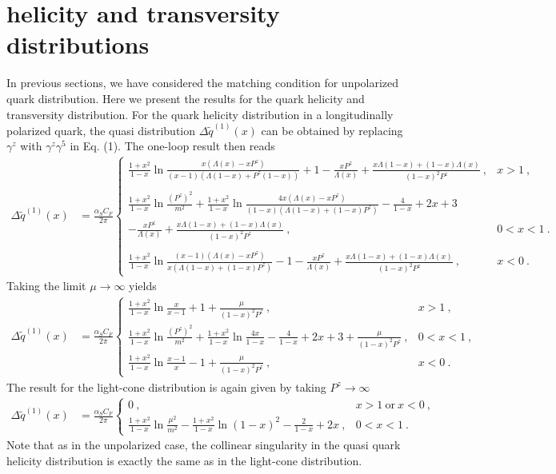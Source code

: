 \section{helicity and transversity distributions}
In previous sections, we have considered the matching condition for unpolarized quark distribution. Here we present the results for the quark helicity and transversity distribution. For the quark helicity distribution in a longitudinally polarized quark, the quasi distribution $\Delta \tilde q^{(1)}(x)$ can be obtained by replacing $\gamma^z$ with $\gamma^z\gamma^5$ in Eq. (1). The one-loop result then reads
\begin{align}\label{helivertexnoexp}
\Delta \tilde q^{(1)}(x)&=\frac{\alpha_S C_F}{2\pi} \left\{ \begin{array} {ll} \frac{1+x^2}{1-x}\ln \frac{x(\Lambda(x)-x P^z)}{(x-1)(\Lambda(1-x)+P^z(1-x))}+1-\frac{x P^z}{\Lambda(x)}+\frac{x\Lambda(1-x)+(1-x)\Lambda(x)}{(1-x)^2 P^z}\ , & x>1\ , \\
\ \\
\frac{1+x^2}{1-x}\ln\frac{(P^z)^2}{m^2}+\frac{1+x^2}{1-x}\ln \frac{4x(\Lambda(x)-x P^z)}{(1-x)(\Lambda(1-x)+(1-x)P^z)}-\frac{4}{1-x}+2x+3\ & \\
-\frac{x P^z}{\Lambda(x)}+\frac{x\Lambda(1-x)+(1-x)\Lambda(x)}{(1-x)^2 P^z}\ , & 0<x<1\ . \\
\ \\
\frac{1+x^2}{1-x}\ln \frac{(x-1)(\Lambda(x)-x P^z)}{x(\Lambda(1-x)+(1-x)P^z)}-1-\frac{x P^z}{\Lambda(x)}+\frac{x\Lambda(1-x)+(1-x)\Lambda(x)}{(1-x)^2P^z}\ , & x<0\ . \end{array} \right.
\end{align}
Taking the limit $\mu\rightarrow \infty$ yields
\begin{align}\label{helivertexLgmu}
\Delta \tilde q^{(1)}(x)&=\frac{\alpha_S C_F}{2\pi} \left\{ \begin{array} {ll} \frac{1+x^2}{1-x}\ln \frac{x}{x-1}+1+\frac{\mu}{(1-x)^2P^z}\ , & x>1\ , \\ \frac{1+x^2}{1-x}\ln \frac{(P^z)^2}{m^2}+\frac{1+x^2}{1-x}\ln\frac{4x}{1-x}-\frac{4}{1-x}+2x+3+\frac{\mu}{(1-x)^2P^z}\ , & 0<x<1\ , \\ \frac{1+x^2}{1-x}\ln \frac{x-1}{x}-1+\frac{\mu}{(1-x)^2P^z}\ , & x<0\ . \end{array} \right.
\end{align}
The result for the light-cone distribution is again given by taking $P^z\to\infty$
\begin{align}\label{helivertexIMF}
\Delta \tilde q^{(1)}(x)&=\frac{\alpha_S C_F}{2\pi} \left\{ \begin{array} {ll} 0\ , & x>1\  \mbox{or}\  x<0\ , \\ \frac{1+x^2}{1-x}\ln \frac{\mu^2}{m^2}-\frac{1+x^2}{1-x}\ln{(1-x)^2}-\frac{2}{1-x}+2x\ , & 0<x<1\ .\end{array} \right.
\end{align}
Note that as in the unpolarized case, the collinear singularity in the quasi quark helicity distribution is exactly the same as in the light-cone distribution.


